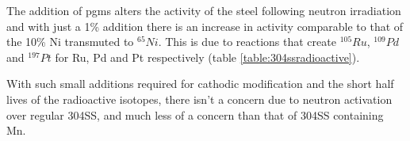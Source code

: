 The addition of \acrshort{pgm}s alters the activity of the steel following neutron irradiation and with just a 1\% addition there is an increase in activity comparable to that of the 10\% Ni transmuted to ${}^{65}Ni$.  This is due to reactions that create ${}^{105}Ru$, 
 ${}^{109}Pd$ and ${}^{197}Pt$ for Ru, Pd and Pt respectively (table \ref{table:304ssradioactive}).  

With such small additions required for cathodic modification and the short half lives of the radioactive isotopes, there isn't a concern due to neutron activation over regular 304SS, and much less of a concern than that of 304SS containing Mn. 





